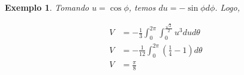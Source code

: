 \documentclass{article}
\newtheorem{example}{Exemplo}[section]
\begin{document}
\begin{example}
            Tomando $u = \cos \phi$, temos $du = -\sin\phi d\phi$. Logo,

            \begin{align*}
                V &= -\frac{1}{3} \int_0^{2\pi} \int_0^{\frac{\sqrt{2}}{2}} u^3 du d\theta\\
                V &= -\frac{1}{12} \int_0^{2\pi} \left( \frac{1}{4} - 1 \right) d\theta\\
                V &= \frac{\pi}{8}
            \end{align*}
        \end{example}
\end{document}
